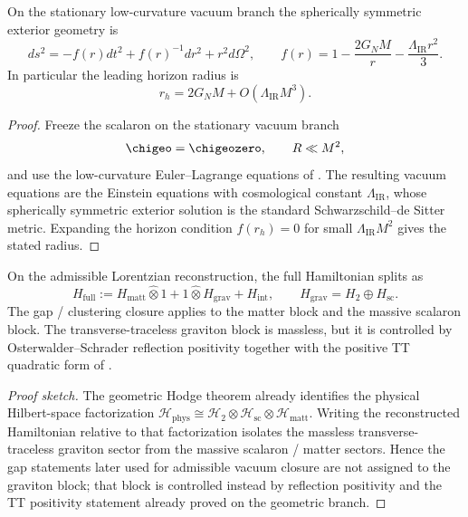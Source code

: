 
\begin{corollary}
\label{cor:schwarzschild_de_sitter_vacuum_branch}
On the stationary low-curvature vacuum branch the spherically symmetric exterior geometry is
\[
ds^2=-f(r)dt^2+f(r)^{-1}dr^2+r^2d\Omega^2,
\qquad
f(r)=1-\frac{2G_NM}{r}-\frac{\Lambda_{\mathrm{IR}}r^2}{3}.
\]
In particular the leading horizon radius is
\[
r_h=2G_NM+O(\Lambda_{\mathrm{IR}}M^3).
\]
\end{corollary}

\begin{proof}
Freeze the scalaron on the stationary vacuum branch
\[
\chigeo=\chigeozero,
\qquad
R\ll M^2,
\]
and use the low-curvature Euler--Lagrange equations of . The
resulting vacuum equations are the Einstein equations with cosmological constant
$\Lambda_{\mathrm{IR}}$, whose spherically symmetric exterior solution is the standard
Schwarzschild--de Sitter metric. Expanding the horizon condition $f(r_h)=0$ for small
$\Lambda_{\mathrm{IR}}M^2$ gives the stated radius.
\end{proof}

\begin{theorem}
\label{thm:sectorial-hamilton-decomposition}
On the admissible Lorentzian reconstruction, the full Hamiltonian splits as
\[
H_{\mathrm{full}}
:=
H_{\mathrm{matt}}\widehat\otimes 1
+
1\widehat\otimes H_{\mathrm{grav}}
+
H_{\mathrm{int}},
\qquad
H_{\mathrm{grav}}=H_{2}\oplus H_{\mathrm{sc}}.
\]
The gap / clustering closure applies to the matter block and the massive scalaron block. The
transverse-traceless graviton block is massless, but it is controlled by Osterwalder--Schrader
reflection positivity together with the positive TT quadratic form of
.
\end{theorem}

\begin{proof}[Proof sketch]
The geometric Hodge theorem already identifies the physical Hilbert-space factorization
$\mathcal H_{\mathrm{phys}}\cong\mathcal H_2\otimes\mathcal H_{\mathrm{sc}}\otimes\mathcal H_{\mathrm{matt}}$.
Writing the reconstructed Hamiltonian relative to that factorization isolates the massless
transverse-traceless graviton sector from the massive scalaron / matter sectors. Hence the gap
statements later used for admissible vacuum closure are not assigned to the graviton block; that
block is controlled instead by reflection positivity and the TT positivity statement already proved
on the geometric branch.
\end{proof}

